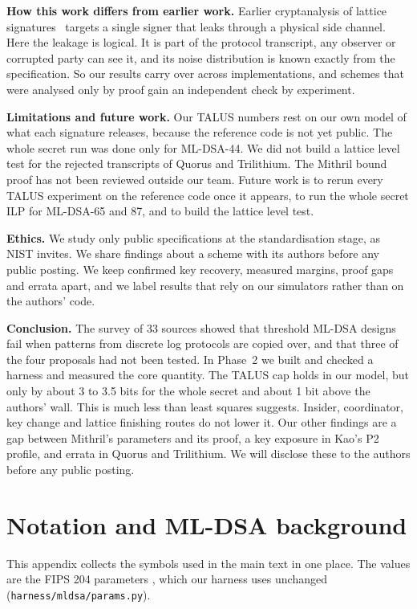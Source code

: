 \documentclass[10pt,conference,a4paper]{IEEEtran}
\begin{document}
\textbf{How this work differs from earlier work.} Earlier cryptanalysis of lattice
signatures~\cite{ilwe,rejected,concealed,yates} targets a single signer that leaks through a physical side channel. Here
the leakage is logical. It is part of the protocol transcript, any observer or corrupted party can see it, and its noise
distribution is known exactly from the specification. So our results carry over across implementations, and schemes that
were analysed only by proof gain an independent check by experiment.

\textbf{Limitations and future work.} Our TALUS numbers rest on our own model of what each signature releases, because
the reference code is not yet public. The whole secret run was done only for ML-DSA-44. We did not build a lattice level
test for the rejected transcripts of Quorus and Trilithium. The Mithril bound proof has not been reviewed outside our team.
Future work is to rerun every TALUS experiment on the reference code once it appears, to run the whole secret ILP for
ML-DSA-65 and 87, and to build the lattice level test.

\textbf{Ethics.} We study only public specifications at the standardisation stage, as NIST invites. We share findings
about a scheme with its authors before any public posting. We keep confirmed key recovery, measured margins, proof gaps and
errata apart, and we label results that rely on our simulators rather than on the authors' code.

\textbf{Conclusion.} The survey of 33 sources showed that threshold ML-DSA designs fail when patterns from discrete log
protocols are copied over, and that three of the four proposals had not been tested. In Phase~2 we built and checked a
harness and measured the core quantity. The TALUS cap holds in our model, but only by about 3 to 3.5 bits for the whole
secret and about 1 bit above the authors' wall. This is much less than least squares suggests. Insider, coordinator, key
change and lattice finishing routes do not lower it. Our other findings are a gap between Mithril's parameters and its
proof, a key exposure in Kao's P2 profile, and errata in Quorus and Trilithium. We will disclose these to the authors before
any public posting.

\appendices

\section{Notation and ML-DSA background}\label{app:notation}
This appendix collects the symbols used in the main text in one place. The values are the FIPS 204 parameters
\cite{fips204}, which our harness uses unchanged (\texttt{harness/mldsa/params.py}).
\end{document}
